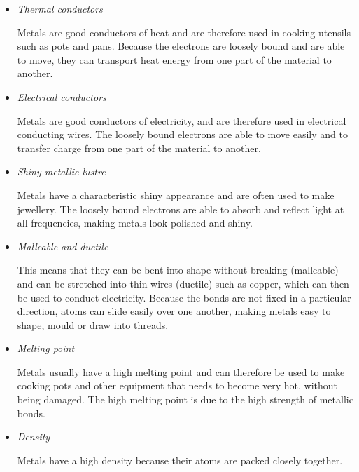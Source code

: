 \begin{itemize}
\item{\textit{Thermal conductors}

Metals are good conductors of heat and are therefore used in cooking utensils such as pots and pans. Because the electrons are loosely bound and are able to move, they can transport heat energy from one part of the material to another.}

\item{\textit{Electrical conductors}

Metals are good conductors of electricity, and are therefore used in electrical conducting wires. The loosely bound electrons are able to move easily and to transfer charge from one part of the material to another.}

\item{\textit{Shiny metallic lustre}

Metals have a characteristic shiny appearance and are often used to make jewellery. The loosely bound electrons are able to absorb and reflect light at all frequencies, making metals look polished and shiny.}

\item{\textit{Malleable and ductile}

This means that they can be bent into shape without breaking (malleable) and can be stretched into thin wires (ductile) such as copper, which can then be used to conduct electricity. Because the bonds are not fixed in a particular direction, atoms can slide easily over one another, making metals easy to shape, mould or draw into threads.}

\item{\textit{Melting point}

Metals usually have a high melting point and can therefore be used to make cooking pots and other equipment that needs to become very hot, without being damaged. The high melting point is due to the high strength of metallic bonds.}

\item{\textit{Density}

Metals have a high density because their atoms are packed closely together.}

\end{itemize}

